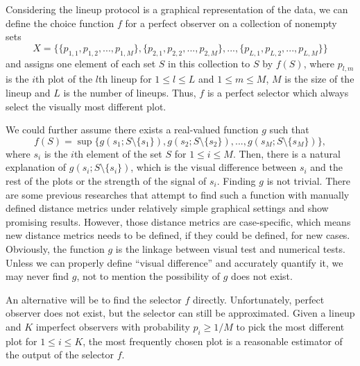 \documentclass[
]{book}
\begin{document}
Considering the lineup protocol is a graphical representation of the data, we can define the choice function \(f\) for a perfect observer on a collection of nonempty sets \[X = \{\{p_{1,1}, p_{1,2}, ..., p_{1,M}\},\{p_{2,1}, p_{2,2}, ..., p_{2,M}\},...,\{p_{L,1}, p_{L,2}, ..., p_{L,M}\}\}\] and assigns one element of each set \(S\) in this collection to \(S\) by \(f(S)\), where \(p_{l,m}\) is the \(i\)th plot of the \(l\)th lineup for \(1\leq l \leq L\) and \(1\leq m \leq M\), \(M\) is the size of the lineup and \(L\) is the number of lineups. Thus, \(f\) is a perfect selector which always select the visually most different plot.

We could further assume there exists a real-valued function \(g\) such that \[f(S) = \sup\{g(s_1; S\setminus\{s_1\}),g(s_2;S\setminus\{s_2\}),...,g(s_M;S\setminus\{s_M\})\},\] where \(s_i\) is the \(i\)th element of the set \(S\) for \(1 \leq i \leq M\). Then, there is a natural explanation of \(g(s_i;S\setminus\{s_i\})\), which is the visual difference between \(s_i\) and the rest of the plots or the strength of the signal of \(s_i\). Finding \(g\) is not trivial. There are some previous researches that attempt to find such a function with manually defined distance metrics under relatively simple graphical settings and show promising results. However, those distance metrics are case-specific, which means new distance metrics needs to be defined, if they could be defined, for new cases. Obviously, the function \(g\) is the linkage between visual test and numerical tests. Unless we can properly define ``visual difference'' and accurately quantify it, we may never find \(g\), not to mention the possibility of \(g\) does not exist.

An alternative will be to find the selector \(f\) directly. Unfortunately, perfect observer does not exist, but the selector can still be approximated. Given a lineup and \(K\) imperfect observers with probability \(p_i \geq 1/M\) to pick the most different plot for \(1 \leq i \leq K\), the most frequently chosen plot is a reasonable estimator of the output of the selector \(f\).

  
\end{document}
